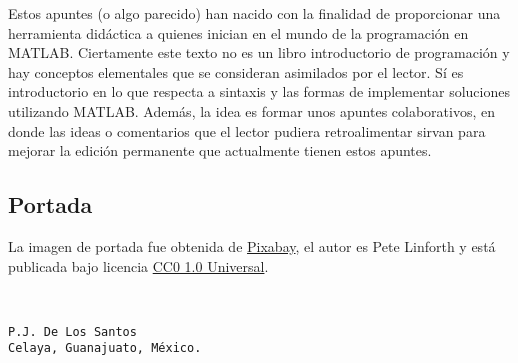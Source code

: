 Estos apuntes (o algo parecido) han nacido con la finalidad de
proporcionar una herramienta didáctica a quienes inician en el mundo de
la programación en MATLAB. Ciertamente este texto no es un libro
introductorio de programación y hay conceptos elementales que se
consideran asimilados por el lector. Sí es introductorio en lo que
respecta a sintaxis y las formas de implementar soluciones utilizando
MATLAB. Además, la idea es formar unos apuntes colaborativos, en donde
las ideas o comentarios que el lector pudiera retroalimentar sirvan para
mejorar la edición permanente que actualmente tienen estos apuntes.

\subsection*{Portada}

La imagen de portada fue obtenida de
\href{https://pixabay.com/es/nano-tecnolog\%C3\%ADa-construcci\%C3\%B3n-1480553/}{Pixabay},
el autor es Pete Linforth y está publicada bajo licencia
\href{https://creativecommons.org/publicdomain/zero/1.0/deed.es}{CC0 1.0
Universal}.




\\  

\begin{verbatim}
P.J. De Los Santos
Celaya, Guanajuato, México.
\end{verbatim}

